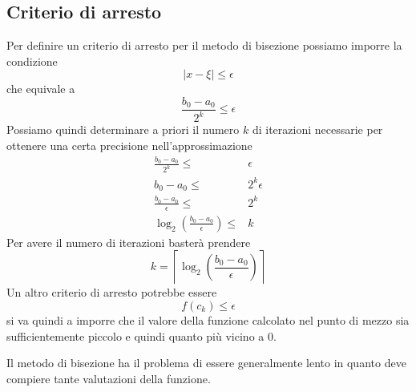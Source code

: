 \subsection{Criterio di arresto}
Per definire un criterio di arresto per il metodo di bisezione possiamo imporre la condizione
\[ |x - \xi| \leq \epsilon \]
che equivale a
\[ \frac{b_0 - a_0}{2^k} \leq \epsilon \]
Possiamo quindi determinare a priori il numero $k$ di iterazioni necessarie per ottenere una certa precisione
nell'approssimazione
\begin{align*}
	\frac{b_0 - a_0}{2^k} \leq                            & \epsilon     \\
	b_0 - a_0 \leq                                        & 2^k \epsilon \\
	\frac{b_0 - a_0}{\epsilon} \leq                       & 2^k          \\
	\log_2 \left( \frac{b_0 - a_0}{\epsilon} \right) \leq & k
\end{align*}
Per avere il numero di iterazioni basterà prendere
\[ k = \left\lceil \log_2 \left( \frac{b_0 - a_0}{\epsilon} \right) \right\rceil \]
Un altro criterio di arresto potrebbe essere
\[ f(c_k) \leq \epsilon \]
si va quindi a imporre che il valore della funzione calcolato nel punto di mezzo sia sufficientemente piccolo
e quindi quanto più vicino a 0.

Il metodo di bisezione ha il problema di essere generalmente lento in quanto deve compiere tante valutazioni
della funzione.